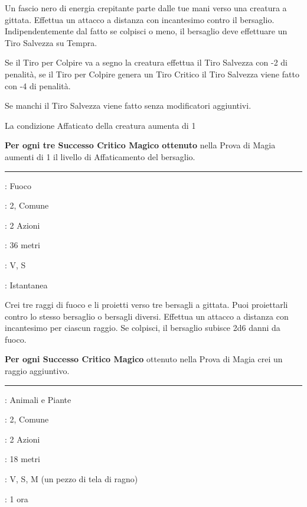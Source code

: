 \begin{multicols}{2}
Un fascio nero di energia crepitante parte dalle tue mani verso una creatura a gittata. Effettua un attacco a distanza con incantesimo contro il bersaglio. Indipendentemente dal fatto se colpisci o meno, il bersaglio deve effettuare un Tiro Salvezza su Tempra.

Se il Tiro per Colpire va a segno la creatura effettua il Tiro Salvezza con -2 di penalità, se il Tiro per Colpire genera un Tiro Critico il Tiro Salvezza viene fatto con -4 di penalità.

Se manchi il Tiro Salvezza viene fatto senza modificatori aggiuntivi.

La condizione Affaticato della creatura aumenta di 1

\textbf{Per ogni tre Successo Critico Magico ottenuto} nella Prova di Magia aumenti di 1 il livello di Affaticamento del bersaglio.

\smallskip\noindent\rule{\linewidth}{2pt} \hypertarget{Raggio Rovente}{}\smallskip{}
\noindent
\begin{description}[noitemsep, topsep=0pt, parsep=0pt, partopsep=0pt, leftmargin=0cm, labelwidth=2.8cm]
	\item[\textbf{Lista di Magia}]: Fuoco
	\item[\textbf{Livello}]: 2, Comune
	\item[\textbf{T. di Lancio}]: 2 Azioni
	\item[\textbf{Gittata}]: 36 metri
	\item[\textbf{Componenti}]: V, S
	\item[\textbf{Durata}]: Istantanea
\end{description}

Crei tre raggi di fuoco e li proietti verso tre bersagli a gittata. Puoi proiettarli contro lo stesso bersaglio o bersagli diversi. Effettua un attacco a distanza con incantesimo per ciascun raggio. Se colpisci, il bersaglio subisce 2d6 danni da fuoco.

\textbf{Per ogni Successo Critico Magico} ottenuto nella Prova di Magia crei un raggio aggiuntivo.

\smallskip\noindent\rule{\linewidth}{2pt} \hypertarget{Ragnatela}{}\smallskip{}
\noindent
\begin{description}[noitemsep, topsep=0pt, parsep=0pt, partopsep=0pt, leftmargin=0cm, labelwidth=2.8cm]
	\item[\textbf{Lista di Magia}]: Animali e Piante
	\item[\textbf{Livello}]: 2, Comune
	\item[\textbf{T. di Lancio}]: 2 Azioni
	\item[\textbf{Gittata}]: 18 metri
	\item[\textbf{Componenti}]: V, S, M (un pezzo di tela di ragno)
	\item[\textbf{Durata}]: 1 ora
\end{description}


\end{multicols}
